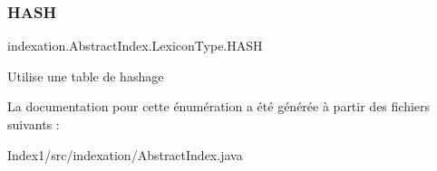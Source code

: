 \subsubsection{\texorpdfstring{H\+A\+SH}{HASH}}
{\footnotesize\ttfamily indexation.\+Abstract\+Index.\+Lexicon\+Type.\+H\+A\+SH}

Utilise une table de hashage 

La documentation pour cette énumération a été générée à partir des fichiers suivants \+:\begin{DoxyCompactItemize}
\item 
Index1/src/indexation/Abstract\+Index.\+java\end{DoxyCompactItemize}
